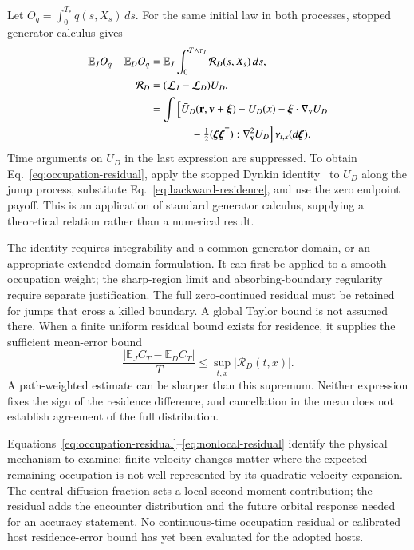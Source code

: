 \documentclass[aps,prd,reprint,amsmath,amssymb,superscriptaddress,nofootinbib,longbibliography,floatfix]{revtex4-2}
\begin{document}
Let $O_q=\int_0^{T_*}q(s,X_s)\,ds$. For the same initial law in both processes, stopped generator calculus gives
\begin{align}
\mathbb E_J O_q-\mathbb E_D O_q
&=\mathbb E_J\int_0^{T\wedge\tau_J}
\mathcal R_D(s,X_s)\,ds,\label{eq:occupation-residual}\\
\mathcal R_D&=(\mathcal L_J-\mathcal L_D)U_D,\nonumber\\
&=\int\Big[\bar U_D(\mathbf r,\mathbf v+\boldsymbol\xi)-U_D(x)
-\boldsymbol\xi\cdot\nabla_{\mathbf v}U_D\nonumber\\
&\hspace{13mm}-\tfrac12(\boldsymbol\xi\boldsymbol\xi^{\mathsf T}):
\nabla_{\mathbf v}^2U_D\Big]\,\nu_{t,x}(d\boldsymbol\xi).
\label{eq:nonlocal-residual}
\end{align}
Time arguments on $U_D$ in the last expression are suppressed. To obtain Eq.~\eqref{eq:occupation-residual}, apply the stopped Dynkin identity~\cite{Dynkin1956} to $U_D$ along the jump process, substitute Eq.~\eqref{eq:backward-residence}, and use the zero endpoint payoff. This is an application of standard generator calculus, supplying a theoretical relation rather than a numerical result.

The identity requires integrability and a common generator domain, or an appropriate extended-domain formulation. It can first be applied to a smooth occupation weight; the sharp-region limit and absorbing-boundary regularity require separate justification. The full zero-continued residual must be retained for jumps that cross a killed boundary. A global Taylor bound is not assumed there. When a finite uniform residual bound exists for residence, it supplies the sufficient mean-error bound
\begin{equation}
\frac{|\mathbb E_J C_T-\mathbb E_D C_T|}{T}
\leq\sup_{t,x}|\mathcal R_D(t,x)|.
\label{eq:residence-error-bound}
\end{equation}
A path-weighted estimate can be sharper than this supremum. Neither expression fixes the sign of the residence difference, and cancellation in the mean does not establish agreement of the full distribution.

Equations~\eqref{eq:occupation-residual}--\eqref{eq:nonlocal-residual} identify the physical mechanism to examine: finite velocity changes matter where the expected remaining occupation is not well represented by its quadratic velocity expansion. The central diffusion fraction sets a local second-moment contribution; the residual adds the encounter distribution and the future orbital response needed for an accuracy statement. No continuous-time occupation residual or calibrated host residence-error bound has yet been evaluated for the adopted hosts.
\end{document}
